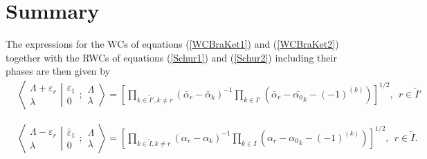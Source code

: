 \documentclass[12pt]{article}
\begin{document}
\section{Summary}

The expressions for the WCs of equations (\ref{WCBraKet1}) and (\ref{WCBraKet2}) together with the RWCs of equations (\ref{Schur1}) and (\ref{Schur2}) including their phases \cite{GIW2,GIW3} are then given by
\begin{align}
& \left\langle\left. 
\begin{array}{c} \Lambda+\varepsilon_r\\ \lambda
 \end{array}
\right|\right.
\left.
\begin{array}{c} \varepsilon_1 \\ 0 
 \end{array}
; \begin{array}{c} \Lambda \\ \lambda
 \end{array}
\right\rangle = \left[ \prod_{k\in \tilde{I}',k\neq r} \left(\bar{\alpha}_r - \bar{\alpha}_k\right)^{-1}\prod_{k\in
I'} \left(\bar{\alpha}_r - \bar{\alpha_0}_k - (-1)^{(k)}\right) \right]^{1/2}
,\ \ r\in \tilde{I}'
\end{align}

\begin{align}
&\left\langle\left. 
\begin{array}{c} \Lambda-\varepsilon_r\\ \lambda
 \end{array}
\right|\right.
\left.
\begin{array}{c} \bar{\varepsilon}_1 \\ 0 
 \end{array}
; \begin{array}{c} \Lambda \\ \lambda
 \end{array}
\right\rangle
= \left[ \prod_{k\in \tilde{I},k\neq r} \left(\alpha_r - \alpha_k \right)^{-1}\prod_{k\in
I} \left(\alpha_r - {\alpha_0}_k - (-1)^{(k)}\right) \right]^{1/2}
,\ \ r\in \tilde{I} .
\end{align}
\end{document}
